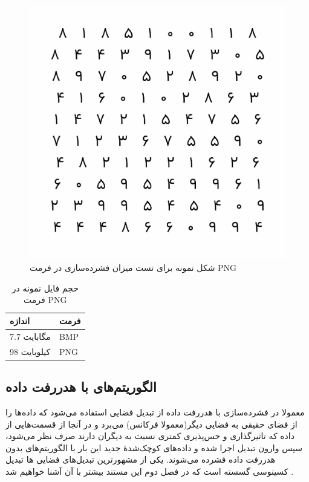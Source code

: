 \begin{figure}[H]
	\centering
	\includegraphics[scale=0.6]{figs/compressed.png}
	\caption[شکل نمونه برای تست میزان فشرده‌سازی در فرمت PNG ]{شکل نمونه برای تست میزان فشرده‌سازی در فرمت PNG \cite{my_picture}}
	\label{example_1}
\end{figure}

\begin{table}[H]
	\centering
	\caption{حجم فایل نمونه در فرمت PNG }
	\label{compare_1}
	\begin{tabular}{@{}ll@{}}
	\toprule
	اندازه & فرمت \\ \midrule
	7.7 مگابایت & BMP \\
	98 کیلوبایت & PNG \\ \bottomrule
	\end{tabular}
\end{table}



\subsection{الگوریتم‌های با هدررفت داده}

معمولا در فشرده‌سازی با هدررفت داده از تبدیل‌‌ فضایی 
استفاده می‌شود که داده‌ها را از فضای حقیقی به فضایی دیگر(معمولا فرکانس) می‌برد و در آنجا از قسمت‌هایی از داده که تاثیرگذاری و حس‌پذیری کمتری
نسبت به دیگران دارند صرف نظر می‌شود، سپس وارون تبدیل اجرا شده و داده‌های کوچک‌شدهٔ جدید این بار با الگوریتم‌های 
بدون هدررفت داده فشرده می‌شوند. یکی از 
مشهورترین
تبدیل‌های فضایی
ها تبدیل کسینوسی گسسته
است که در فصل‌ دوم این مستند بیشتر با آن آشنا خواهیم شد
\cite{dct}.
